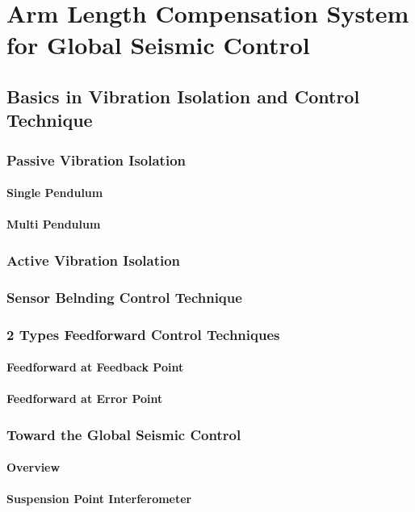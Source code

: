 \chapter{Arm Length Compensation System for Global Seismic Control}
\section{Basics in Vibration Isolation and Control Technique}
\subsection{Passive Vibration Isolation}
\subsubsection{Single Pendulum}
\subsubsection{Multi Pendulum}
\subsection{Active Vibration Isolation}
\subsection{Sensor Belnding Control Technique}
\subsection{2 Types Feedforward Control Techniques}
\subsubsection{Feedforward at Feedback Point} %
\subsubsection{Feedforward at Error Point} %

\subsection{Toward the Global Seismic Control}
\subsubsection{Overview}
\subsubsection{Suspension Point Interferometer}

